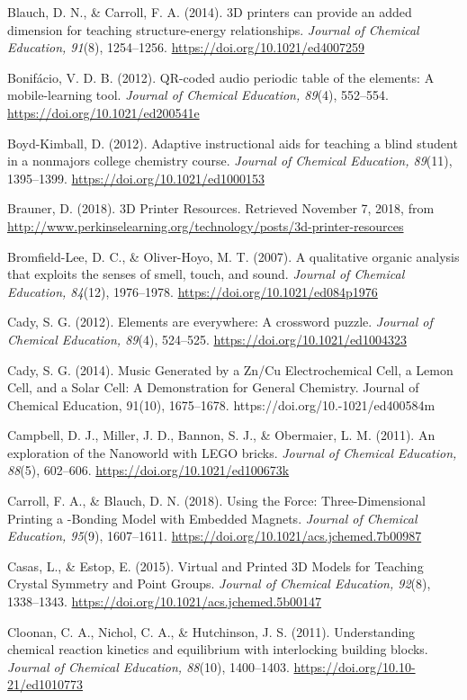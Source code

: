 \documentclass[11.5pt]{sig-alternate} %
\begin{document}
Blauch, D. N., \& Carroll, F. A. (2014). 3D printers can provide an added dimension for teaching structure-energy relationships. \textit{Journal of Chemical Education, 91}(8), 1254–1256. \url{https://doi.org/10.1021/ed4007259}

Bonifácio, V. D. B. (2012). QR-coded audio periodic table of the elements: A mobile-learning tool. \textit{Journal of Chemical Education, 89}(4), 552–554. \url{https://doi.org/10.1021/ed200541e}

Boyd-Kimball, D. (2012). Adaptive instructional aids for teaching a blind student in a nonmajors college chemistry course. \textit{Journal of Chemical Education, 89}(11), 1395–1399. \url{https://doi.org/10.1021/ed1000153}

Brauner, D. (2018). 3D Printer Resources. Retrieved November 7, 2018, from \url{http://www.perkinselearning.org/technology/posts/3d-printer-resources}

Bromfield-Lee, D. C., \& Oliver-Hoyo, M. T. (2007). A qualitative organic analysis that exploits the senses of smell, touch, and sound. \textit{Journal of Chemical Education, 84}(12), 1976–1978. \url{https://doi.org/10.1021/ed084p1976}

Cady, S. G. (2012). Elements are everywhere: A crossword puzzle. \textit{Journal of Chemical Education, 89}(4), 524–525. \url{https://doi.org/10.1021/ed1004323}

Cady, S. G. (2014). Music Generated by a Zn/Cu Electrochemical Cell, a Lemon Cell, and a Solar Cell: A Demonstration for General Chemistry. Journal of Chemical Education, 91(10), 1675–1678. https://doi.org/10.-1021/ed400584m

Campbell, D. J., Miller, J. D., Bannon, S. J., \& Obermaier, L. M. (2011). An exploration of the Nanoworld with LEGO bricks. \textit{Journal of Chemical Education, 88}(5), 602–606. \url{https://doi.org/10.1021/ed100673k}

Carroll, F. A., \& Blauch, D. N. (2018). Using the Force: Three-Dimensional Printing a \textpi-Bonding Model with Embedded Magnets. \textit{Journal of Chemical Education, 95}(9), 1607–1611. \url{https://doi.org/10.1021/acs.jchemed.7b00987}

Casas, L., \& Estop, E. (2015). Virtual and Printed 3D Models for Teaching Crystal Symmetry and Point Groups. \textit{Journal of Chemical Education, 92}(8), 1338–1343. \url{https://doi.org/10.1021/acs.jchemed.5b00147}

Cloonan, C. A., Nichol, C. A., \& Hutchinson, J. S. (2011). Understanding chemical reaction kinetics and equilibrium with interlocking building blocks. \textit{Journal of Chemical Education, 88}(10), 1400–1403. \url{https://doi.org/10.10-21/ed1010773}
\end{document}
